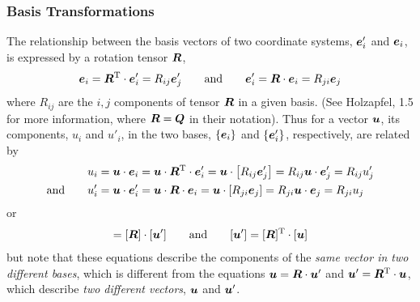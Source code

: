 \documentclass[10pt,letterpaper,oneside]{report}
\newcommand{\ten}[1]{\mbox{\boldmath $#1$}{}}
\newcommand{\scas}[1]{\mbox{{\scriptsize{${\rm{#1}}$}}}{}}
\begin{document}
\subsubsection{Basis Transformations}
The relationship between the basis vectors of two coordinate systems, $\ten{e}'_i$ and $\ten{e}_i$, is expressed by a rotation tensor $\ten{R}$, 
\begin{align}
\ten{e}_i = \ten{R}^{\scas{T}} \cdot \ten{e}'_i = R_{ij} \ten{e}'_j   
\qquad \text{and} \qquad  
\ten{e}'_i = \ten{R} \cdot \ten{e}_i = R_{ji} \ten{e}_j
\end{align}
where $R_{ij}$ are the $i,j$ components of tensor $\ten{R}$ in a given basis.  (See Holzapfel, 1.5 for more information, where $\ten{R} = \ten{Q}$ in their notation).
Thus for a vector $\ten{u}$, its components, $u_i$ and $u'_i$, in the two bases, $\lbrace \ten{e}_i \rbrace$ and $\lbrace \ten{e}'_i \rbrace$, respectively, are related by
\begin{align}
u_i &= \ten{u} \cdot \ten{e}_i = \ten{u} \cdot \ten{R}^{\scas{T}} \cdot \ten{e}'_i = \ten{u} \cdot \left[ R_{ij} \ten{e}'_j \right] = R_{ij} \ten{u} \cdot \ten{e}'_j = R_{ij} u'_j 
\\ \mbox{and} \qquad
u'_i &= \ten{u} \cdot \ten{e}'_i = \ten{u} \cdot \ten{R} \cdot \ten{e}_i = \ten{u} \cdot \left[ R_{ji} \ten{e}_j \right] = R_{ji} \ten{u} \cdot \ten{e}_j = R_{ji} u_j
\end{align}
or
\begin{align}
[ \ten{u} ] = [ \ten{R} ] \cdot [ \ten{u}' ] \qquad \text{and} \qquad  [ \ten{u}' ] = [ \ten{R} ]^{\scas{T}} \cdot [ \ten{u} ]
\end{align}
but note that these equations describe the components of the \emph{same vector in two different bases}, which is different from the equations $\ten{u} = \ten{R} \cdot \ten{u}'$ and $\ten{u}' = \ten{R}^{\scas{T}} \cdot \ten{u}$, which describe \emph{two different vectors}, $\ten{u}$ and $\ten{u}'$. 
\end{document}
